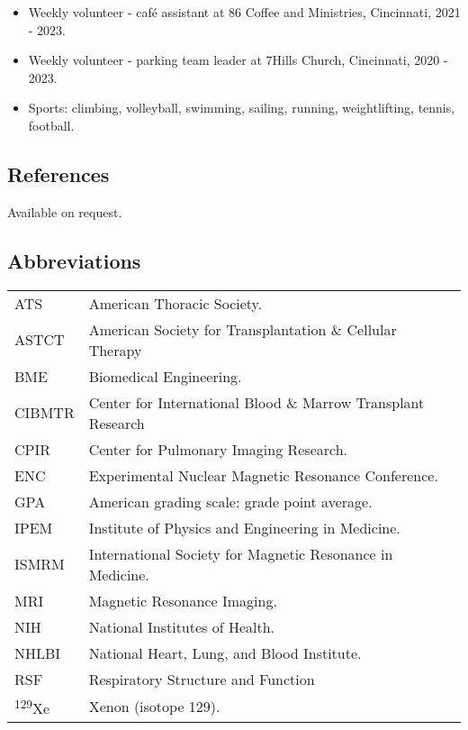 \documentclass[12pt,]{scrartcl}
\begin{document}
\begin{itemize}
  \leftskip-0.25in
  \item Weekly volunteer - caf\'{e} assistant at 86 Coffee and Ministries, Cincinnati, 2021 - 2023.
  \item Weekly volunteer - parking team leader at 7Hills Church, Cincinnati, 2020 - 2023.
  \item Sports: climbing, volleyball, swimming, sailing, running, weightlifting, tennis, football.
\end{itemize}

%

\subsection{References}\label{references}

Available on request.

\newpage

\subsection{Abbreviations}\label{abbreviations}
\begin{table}[h!]
{\def\arraystretch{1.5}\tabcolsep=0pt
\begin{tabular}{p{0.15\linewidth}p{0.85\linewidth}}
    ATS & American Thoracic Society. \\
    ASTCT & American Society for Transplantation \& Cellular Therapy \\
    BME & Biomedical Engineering. \\
    CIBMTR & Center for International Blood \& Marrow Transplant Research \\
    CPIR & Center for Pulmonary Imaging Research. \\
    ENC & Experimental Nuclear Magnetic Resonance Conference. \\
    GPA & American grading scale: grade point average. \\
    IPEM & Institute of Physics and Engineering in Medicine. \\
    ISMRM & International Society for Magnetic Resonance in Medicine. \\
    MRI & Magnetic Resonance Imaging. \\
    NIH & National Institutes of Health. \\
    NHLBI & National Heart, Lung, and Blood Institute. \\
    RSF & Respiratory Structure and Function \\
    \textsuperscript{129}Xe & Xenon (isotope 129). \\
\end{tabular}%
}
\end{table}
\end{document}
